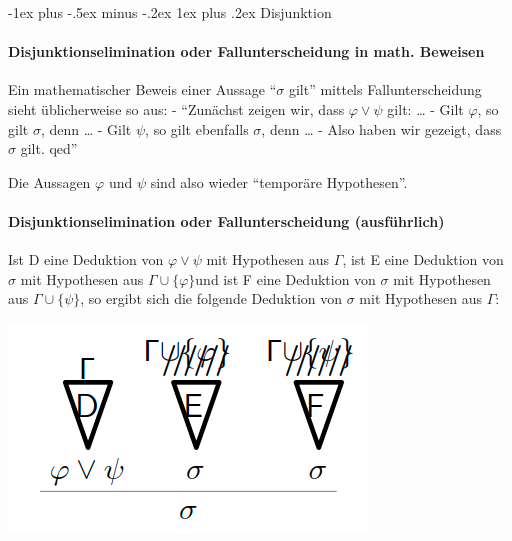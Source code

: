 \documentclass[a4paper]{article}
\makeatletter
\renewcommand{\subsubsection}{\@startsection{subsubsection}{3}{0mm}%
                {-1ex plus -.5ex minus -.2ex}%
                {1ex plus .2ex}%
                {\normalfont\small\bfseries}}
\makeatother
\begin{document}
\begin{multicols}{3}
  \subsubsection{Disjunktion}\label{disjunktion}

  \paragraph{Disjunktionselimination oder Fallunterscheidung in math.
    Beweisen}\label{disjunktionselimination-oder-fallunterscheidung-in-math.-beweisen}

  Ein mathematischer Beweis einer Aussage ``$\sigma$ gilt'' mittels
  Fallunterscheidung sieht üblicherweise so aus: - ``Zunächst zeigen wir,
  dass $\varphi\vee\psi$ gilt: \ldots{} - Gilt $\varphi$, so gilt
  $\sigma$, denn \ldots{} - Gilt $\psi$, so gilt ebenfalls $\sigma$, denn
  \ldots{} - Also haben wir gezeigt, dass $\sigma$ gilt. qed''

  Die Aussagen $\varphi$ und $\psi$ sind also wieder ``temporäre
  Hypothesen''.

  \paragraph{Disjunktionselimination oder Fallunterscheidung
    (ausführlich)}\label{disjunktionselimination-oder-fallunterscheidung-ausfuxfchrlich}

  Ist D eine Deduktion von $\varphi\vee\psi$ mit Hypothesen aus $\Gamma$,
  ist E eine Deduktion von $\sigma$ mit Hypothesen aus
  $\Gamma\cup\{\varphi\}$und ist F eine Deduktion von $\sigma$ mit
  Hypothesen aus $\Gamma\cup\{\psi\}$, so ergibt sich die folgende
  Deduktion von $\sigma$ mit Hypothesen aus $\Gamma$:


  \includegraphics[width=\linewidth]{Assets/Logik-Disjunktionselimination.png}


\end{multicols}
\end{document}
